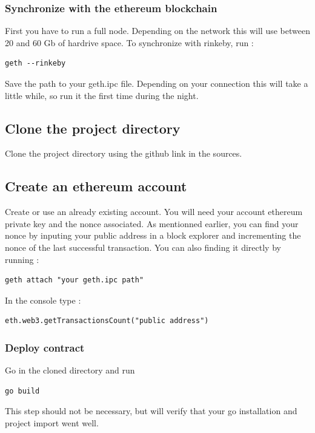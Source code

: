 \documentclass[11pt, a4paper, twoside, openright]{book} %
\begin{document}
\subsubsection*{Synchronize with the ethereum blockchain}
First you have to run a full node. Depending on the network this will use between 20 and 60 Gb of hardrive space. To synchronize with rinkeby, run :
\begin{lstlisting}
geth --rinkeby
\end{lstlisting}
Save the path to your geth.ipc file. 
Depending on your connection this will take a little while, so run it the first time during the night.
\subsection*{Clone the project directory}
Clone the project directory using the github link in the sources. 
\subsection*{Create an ethereum account}
Create or use an already existing account. You will need your account ethereum private key and the nonce associated. As mentionned earlier, you can find your nonce by inputing your public address in a block explorer and incrementing the nonce of the last successful transaction. You can also finding it directly by running : \\
\begin{lstlisting}
geth attach "your geth.ipc path"
\end{lstlisting}  
In the console type : 
\begin{lstlisting}
eth.web3.getTransactionsCount("public address")
\end{lstlisting}
\subsubsection*{Deploy contract}
Go in the cloned directory and run
\begin{lstlisting}
go build
\end{lstlisting}
This step should not be necessary, but will verify that your go installation and project import went well.\\\\
\end{document}
